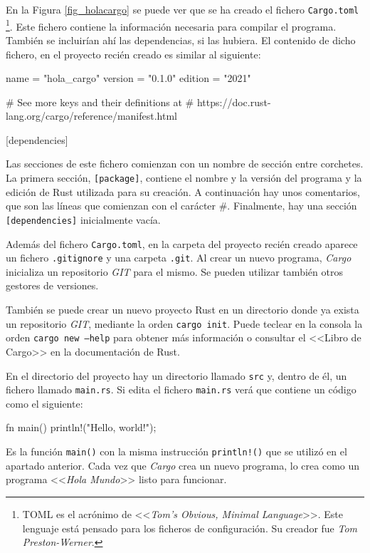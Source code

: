 En la Figura \ref{fig_holacargo} se puede ver que se ha creado el fichero \texttt{Cargo.toml} \footnote{TOML es el acrónimo de <<\textit{Tom's Obvious, Minimal Language}>>. Este lenguaje está pensado para los ficheros de configuración. Su creador fue \textit{Tom Preston-Werner}.}. Este fichero contiene la información necesaria para compilar el programa. También se incluirían ahí las dependencias, si las hubiera. El contenido de dicho fichero, en el proyecto recién creado es similar al siguiente:
\begin{Codigo}
[package]
name = "hola_cargo"
version = "0.1.0"
edition = "2021"

# See more keys and their definitions at
# https://doc.rust-lang.org/cargo/reference/manifest.html

[dependencies]
\end{Codigo}

Las secciones de este fichero comienzan con un nombre de sección entre corchetes. La primera sección, \texttt{[package]}, contiene el nombre y la versión del programa y la edición de Rust utilizada para su creación. A continuación hay unos comentarios, que son las líneas que comienzan con el carácter \#. Finalmente, hay una sección \texttt{[dependencies]} inicialmente vacía.

Además del fichero \texttt{Cargo.toml}, en la carpeta del proyecto recién creado aparece un fichero \texttt{.gitignore} y una carpeta \texttt{.git}. Al crear un nuevo programa, \textit{Cargo} inicializa un repositorio \textit{GIT} para el mismo. Se pueden utilizar también otros gestores de versiones.

También se puede crear un nuevo proyecto Rust en un directorio donde ya exista un repositorio \textit{GIT}, mediante la orden \texttt{cargo init}. Puede teclear en la consola la orden \texttt{cargo new --help} para obtener más información o consultar el <<Libro de Cargo>> \citep{CargoBook} en la
documentación de Rust.

En el directorio del proyecto hay un directorio llamado \texttt{src} y, dentro de él, un fichero llamado \texttt{main.rs}. Si edita el fichero \texttt{main.rs} verá que contiene un código como el siguiente:
\begin{Codigo}
fn main() {
   println!("Hello, world!");
}
\end{Codigo}

Es la función \texttt{main()} con la misma instrucción \texttt{println!()} que se utilizó en el apartado anterior. Cada vez que \textit{Cargo} crea un nuevo programa, lo crea como un programa <<\textit{Hola Mundo}>> listo para funcionar.


